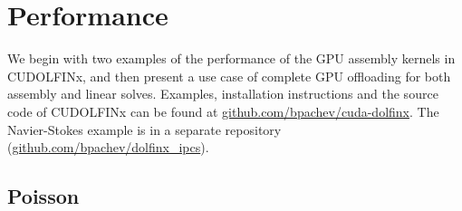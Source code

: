 \section*{Performance}

We begin with two examples of the performance of the GPU assembly kernels in CUDOLFINx, and then present a use case of complete GPU offloading for both assembly and linear solves. Examples, installation instructions and the source code of CUDOLFINx can be found at \href{https://github.com/bpachev/cuda-dolfinx}{github.com/bpachev/cuda-dolfinx}. The Navier-Stokes example is in a separate repository (\href{https://github.com/bpachev/dolfinx\_ipcs}{github.com/bpachev/dolfinx\_ipcs}).

\subsection*{Poisson}


